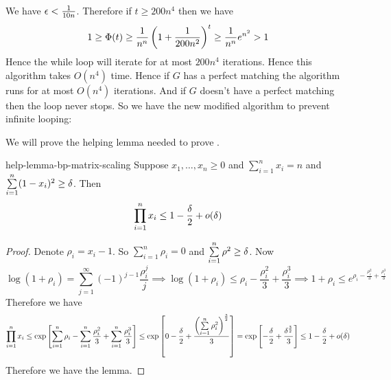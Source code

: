 We have $\epsilon<\frac1{10n}$. Therefore if $t\geq 200n^4$ then we have $$1\geq \Phi(t)\geq \frac1{n^n}\left(1+\frac1{200n^2}\right)^t\geq \frac1{n^n}e^{n^2}>1$$Hence the while loop will iterate for at most $200n^4$ iterations. Hence this algorithm takes $O(n^4)$ time. Hence if $G$ has a perfect matching the algorithm runs for at most $O(n^4)$ iterations. And if $G$ doesn't have a perfect matching then the loop never stops. So we have the new modified algorithm to prevent infinite looping:

\begin{algorithm}
	\DontPrintSemicolon
	\caption{}
\end{algorithm} We will prove the helping lemma needed to prove .

\begin{lemma}{}{help-lemma-bp-matrix-scaling}
	Suppose $x_1,\dots, x_n\geq 0$ and $\sum\limits_{i=1}^n x_i=n$ and $\sum\limits_{i=1}^n (1-x_i)^2\geq \delta$. Then $$\prod\limits_{i=1}^n x_i\leq 1-\frac{\delta}2+o(\delta)$$
\end{lemma}
\begin{proof}
	Denote $\rho_i=x_i-1$. So $\sum\limits_{i=1}^n \rho_i=0$ and $\sum\limits_{i=1}^n \rho^2\geq \delta$. Now $$\log(1+\rho_i)=\sum_{j=1}^{\infty}(-1)^{j-1}\frac{\rho_i^j}{j}\implies \log(1+\rho_i)\leq \rho_i-\frac{\rho_i^2}3+\frac{\rho_i^3}3\implies 1+\rho_i\leq e^{\rho_i-\frac{\rho_i^2}3+\frac{\rho_i^3}3}$$Therefore we have $$\prod_{i=1}^n x_i\leq \exp\left[\sum_{i=1}^n \rho_i-\sum_{i=1}^n\frac{\rho_i^2}3+\sum_{i=1}^n\frac{\rho_i^3}3\right]\leq \exp\left[0-\frac{\delta}2+\frac{\left(\sum\limits_{i=1}^n\rho_i^2\right)^{\frac32} }3  \right]=\exp\left[-\frac{\delta}2+\frac{\delta^{\frac32}}3  \right]\leq 1-\frac{\delta}2+o(\delta)$$Therefore we have the lemma. 
\end{proof}

